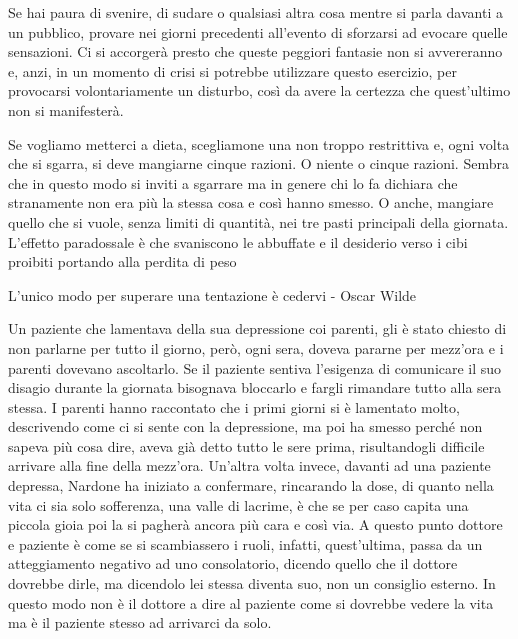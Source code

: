 \documentclass[12pt]{book} %
\begin{document}
Se hai paura di svenire, di sudare o qualsiasi altra cosa mentre si parla davanti a un pubblico, provare nei giorni
precedenti all'evento di sforzarsi ad evocare quelle sensazioni. Ci si accorgerà presto che queste
peggiori fantasie non si avvereranno e, anzi, in un momento di crisi si potrebbe utilizzare questo esercizio, per
provocarsi volontariamente un disturbo, così da avere la certezza che quest'ultimo non si
manifesterà.

Se vogliamo metterci a dieta, scegliamone una non troppo restrittiva e, ogni volta che si sgarra, si deve mangiarne
cinque razioni. O niente o cinque razioni. Sembra che in questo modo si inviti a sgarrare ma in genere chi lo fa
dichiara che stranamente non era più la stessa cosa e così hanno smesso. O anche, mangiare quello che si vuole, senza
limiti di quantità, nei tre pasti principali della giornata. L'effetto paradossale è che
svaniscono le abbuffate e il desiderio verso i cibi proibiti portando alla perdita di peso

L'unico modo per superare una tentazione è cedervi - Oscar Wilde

Un paziente che lamentava della sua depressione coi parenti, gli è stato chiesto di non parlarne per tutto il giorno,
però, ogni sera, doveva pararne per mezz'ora e i parenti dovevano ascoltarlo. Se il paziente
sentiva l'esigenza di comunicare il suo disagio durante la giornata bisognava bloccarlo e fargli
rimandare tutto alla sera stessa. I parenti hanno raccontato che i primi giorni si è lamentato molto, descrivendo come
ci si sente con la depressione, ma poi ha smesso perché non sapeva più cosa dire, aveva già detto tutto le sere prima,
risultandogli difficile arrivare alla fine della mezz'ora. Un'altra volta
invece, davanti ad una paziente depressa, Nardone ha iniziato a confermare, rincarando la dose, di quanto nella vita ci
sia solo sofferenza, una valle di lacrime, è che se per caso capita una piccola gioia poi la si pagherà ancora più cara
e così via. A questo punto dottore e paziente è come se si scambiassero i ruoli, infatti,
quest'ultima, passa da un atteggiamento negativo ad uno consolatorio, dicendo quello che il
dottore dovrebbe dirle, ma dicendolo lei stessa diventa suo, non un consiglio esterno. In questo modo non è il dottore
a dire al paziente come si dovrebbe vedere la vita ma è il paziente stesso ad arrivarci da solo.
\end{document}
